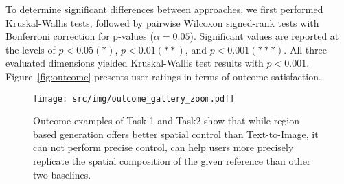    To determine significant differences between approaches, we first performed Kruskal-Wallis tests, followed by pairwise Wilcoxon signed-rank tests with Bonferroni correction for p-values ($\alpha = 0.05$). Significant values are reported at the levels of $p<0.05 (*)$, $p<0.01 (**)$, and $p<0.001 (***)$. 
    All three evaluated dimensions yielded Kruskal-Wallis test results with $p<0.001$.
    Figure~\ref{fig:outcome} presents user ratings in terms of outcome satisfaction.


\begin{figure*}[t]
    \centering
    \texttt{[image: src/img/outcome\_gallery\_zoom.pdf]}
    \vspace{-2mm}
    \caption{Outcome examples of Task 1 and Task2 show that while region-based generation offers better spatial control than Text-to-Image, it can not perform precise control, \tool can help users more precisely replicate the spatial composition of the given reference than other two baselines.}
    \label{fig:outcome_task1}
    \vspace{-1mm}
\end{figure*}



